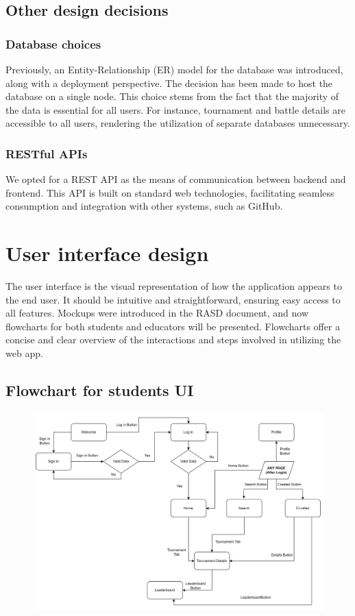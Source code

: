 \documentclass[12pt, a4paper]{report}
\begin{document}
    \section{Other design decisions}
        \subsection{Database choices}
        Previously, an Entity-Relationship (ER) model for the database was introduced, along with a deployment perspective.
        The decision has been made to host the database on a single node.
        This choice stems from the fact that the majority of the data is essential for all users.
        For instance, tournament and battle details are accessible to all users, rendering the utilization of separate databases unnecessary.
        
        \subsection{RESTful APIs}
        We opted for a REST API as the means of communication between backend and frontend.
        This API is built on standard web technologies, facilitating seamless consumption and integration with other systems, such as GitHub.

\chapter{User interface design}
    The user interface is the visual representation of how the application appears to the end user.
    It should be intuitive and straightforward, ensuring easy access to all features.
    Mockups were introduced in the RASD document, and now flowcharts for both students and educators will be presented.
    Flowcharts offer a concise and clear overview of the interactions and steps involved in utilizing the web app.

    \section{Flowchart for students UI}
    \begin{figure}[H]
        \centering
        \includegraphics[width=0.9\linewidth]{images/students_UI.png}
    \end{figure}
\end{document}
